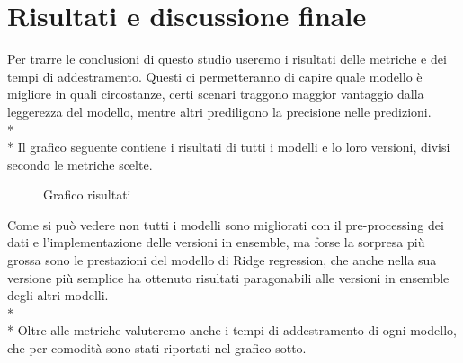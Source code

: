 \section{Risultati e discussione finale}\label{sec:risultati}
\normalsize

Per trarre le conclusioni di questo studio useremo i risultati delle metriche e dei tempi di addestramento. Questi ci permetteranno di capire quale modello è migliore in quali circostanze, certi scenari traggono maggior vantaggio dalla leggerezza del modello, mentre altri prediligono la precisione nelle predizioni.\\*\\*
Il grafico seguente contiene i risultati di tutti i modelli e lo loro versioni, divisi secondo le metriche scelte.
\begin{figure}[ht]
	\caption{Grafico risultati}
	\label{fig:ris}
\end{figure}


Come si può vedere non tutti i modelli sono migliorati con il pre-processing dei dati e l'implementazione delle versioni in ensemble, ma forse la sorpresa più grossa sono le prestazioni del modello di Ridge regression, che anche nella sua versione più semplice ha ottenuto risultati paragonabili alle versioni in ensemble degli altri modelli.\\*\\*
Oltre alle metriche valuteremo anche i tempi di addestramento di ogni modello, che per comodità sono stati riportati nel grafico sotto.

